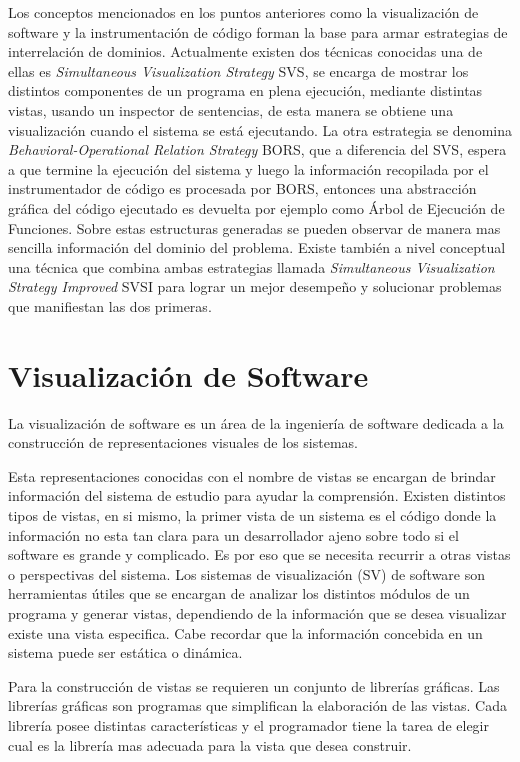 \documentclass[12pt]{report}
\begin{document}
Los conceptos mencionados en los puntos anteriores como la visualización de software y la instrumentación de código forman la base para armar estrategias de interrelación de dominios.
Actualmente existen dos técnicas conocidas una de ellas es \textit{Simultaneous Visualization Strategy} SVS, se encarga de mostrar los distintos componentes de un programa en plena ejecución, mediante distintas vistas, usando un inspector de sentencias, de esta manera se obtiene una visualización cuando el sistema se está ejecutando.
La otra estrategia se denomina \textit{Behavioral-Operational Relation Strategy} BORS, que a diferencia del SVS, espera a que termine la ejecución del sistema y luego la información recopilada por el instrumentador de código es procesada por BORS, entonces una abstracción gráfica del código ejecutado es devuelta por ejemplo como Árbol de Ejecución de Funciones. Sobre estas estructuras generadas se pueden observar de manera mas sencilla información del dominio del problema.
Existe también a nivel conceptual una técnica que combina ambas estrategias llamada \textit{Simultaneous Visualization Strategy Improved} SVSI para lograr un mejor desempeño y solucionar problemas que manifiestan las dos primeras.\cite{BRM10,MPMR07}

\section{Visualización de Software}

La visualización de software es un área de la ingeniería de software dedicada a la construcción de representaciones visuales de los sistemas. 

Esta representaciones conocidas con el nombre de vistas se encargan de brindar información del sistema de estudio para ayudar la comprensión. Existen distintos tipos de vistas, en si mismo, la primer vista de un sistema es el código donde la información no esta tan clara para un desarrollador ajeno sobre todo si el software es grande y complicado. Es por eso que se necesita recurrir a otras vistas o perspectivas del sistema.
Los sistemas de visualización (SV) de software son herramientas útiles que se encargan de analizar los distintos módulos de un programa y generar vistas, dependiendo de la información que se desea visualizar existe una vista especifica\cite{MPMR07}. Cabe recordar que la información concebida en un sistema puede ser estática o dinámica.

Para la construcción de vistas se requieren un conjunto de librerías gráficas. Las librerías gráficas son programas que simplifican la elaboración de las vistas. Cada librería posee distintas características y el programador tiene la tarea de elegir cual es la librería mas adecuada para la vista que desea construir.
\end{document}
